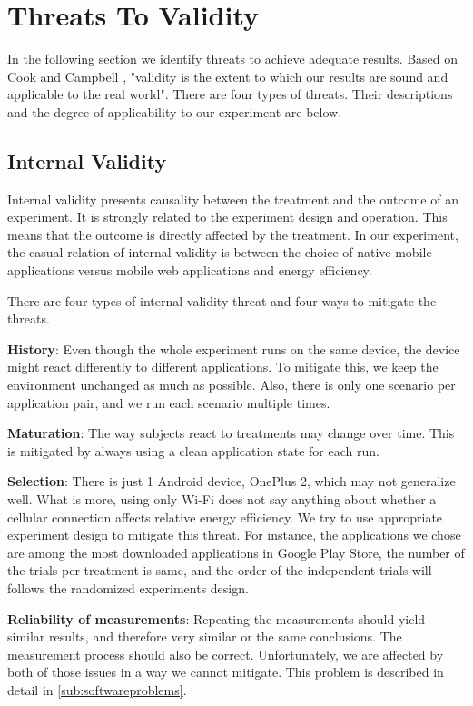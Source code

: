 \section{Threats To Validity}\label{sec:threats}
In the following section we identify threats to achieve adequate results. Based on Cook and Campbell \cite{cook1979quasi}, "validity is the extent to which our results are sound and applicable to the real world". There are four types of threats. Their descriptions and the degree of applicability to our experiment are below.

\subsection{Internal Validity}
Internal validity presents causality between the treatment and the outcome of an experiment. It is strongly related to the experiment design and operation. This means that the outcome is directly affected by the treatment. In our experiment, the casual relation of internal validity is between the choice of native mobile applications versus mobile web applications and energy efficiency.

There are four types of internal validity threat and four ways to mitigate the threats.

\textbf{History}: Even though the whole experiment runs on the same device, the device might react differently to different applications. To mitigate this, we keep the environment unchanged as much as possible. Also, there is only one scenario per application pair, and we run each scenario multiple times.

\textbf{Maturation}: The way subjects react to treatments may change over time. This is mitigated by always using a clean application state for each run.

\textbf{Selection}: There is just 1 Android device, OnePlus 2, which may not generalize well. What is more, using only Wi-Fi does not say anything about whether a cellular connection affects relative energy efficiency. We try to use appropriate experiment design to mitigate this threat. For instance, the applications we chose are among the most downloaded applications in Google Play Store, the number of the trials per treatment is same, and the order of the independent trials will follows the randomized experiments design.

\textbf{Reliability of measurements}: Repeating the measurements should yield similar results, and therefore very similar or the same conclusions. The measurement process should also be correct. Unfortunately, we are affected by both of those issues in a way we cannot mitigate. This problem is described in detail in \autoref{sub:softwareproblems}.

